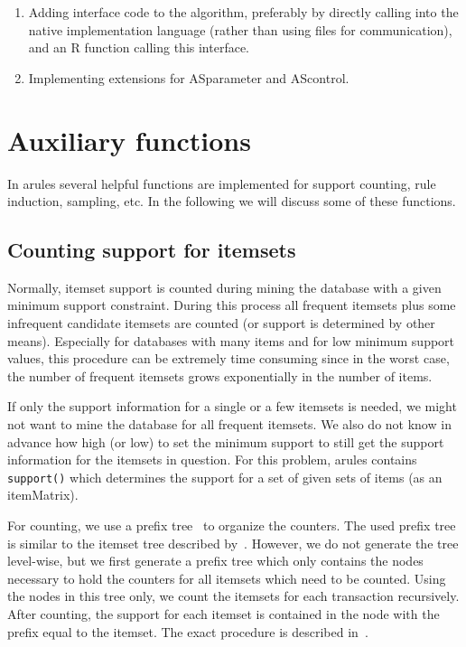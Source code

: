 \documentclass[10pt,a4paper]{article}
\newcommand{\strong}[1]{{\normalfont\fontseries{b}\selectfont #1}}
\newcommand{\class}[1]{\mbox{\textsf{#1}}}
\newcommand{\func}[1]{\mbox{\texttt{#1()}}}
\newcommand{\pkg}[1]{\strong{#1}}
\newcommand{\proglang}[1]{\textsf{#1}}
\begin{document}
\begin{enumerate}
 \item Adding interface code to the algorithm, preferably by directly
  calling into the native implementation language (rather than using
  files for communication), and an \proglang{R} function calling this
  interface.
 \item Implementing extensions for \class{ASparameter} and
  \class{AScontrol}.
\end{enumerate}



\section{Auxiliary functions \label{sec:auxiliary}}

In \pkg{arules} several helpful functions are implemented for
support counting, rule induction, sampling, etc.
In the following we will discuss some of these functions.

\subsection{Counting support for itemsets\label{sec:counting}}

Normally, itemset support is counted during mining the database with a
given minimum support constraint.  During this process all frequent
itemsets plus some infrequent candidate itemsets are counted (or support
is determined by other means).  Especially for databases with many items
and for low minimum support values, this procedure can be extremely time
consuming since in the worst case, the number of frequent itemsets grows
exponentially in the number of items.

If only the support information for a single or a few itemsets is needed,
we might not want to mine the database for all frequent itemsets. 
We also do not know in advance how high (or low) to set the minimum support to
still get the support information for the itemsets in question.
For this problem, \pkg{arules} contains \func{support}
which determines the support for a set of given sets of items
(as an \class{itemMatrix}).

For counting, we use a prefix tree~\citep{arules:Knuth:1997} to organize the
counters. The used prefix tree is similar to the itemset tree described
by~\cite{arules:Borgelt+Kruse:2002}. However, we do not generate the tree
level-wise, but we first generate a prefix tree which only contains the nodes
necessary to hold the counters for all itemsets which need to be counted.
Using the nodes in this tree only, we count the itemsets for each
transaction recursively. After counting, the support for each itemset is
contained in the node with the prefix equal to the itemset. The exact
procedure is described in~\cite{arules:Hahsler+Buchta+Hornik:2007}.
\end{document}

